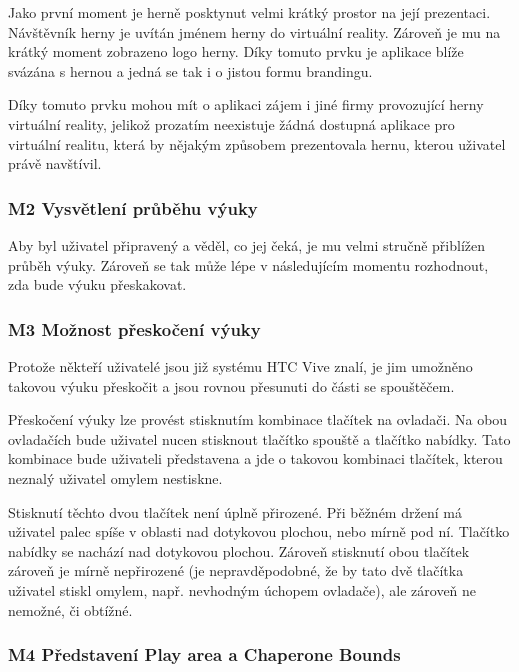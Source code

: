 Jako první moment je herně posktynut velmi krátký prostor na její
prezentaci. Návštěvník herny je uvítán jménem herny do virtuální
reality. Zároveň je mu na krátký moment zobrazeno logo herny. Díky
tomuto prvku je aplikace blíže svázána s hernou a jedná se tak i o
jistou formu brandingu.

Díky tomuto prvku mohou mít o aplikaci zájem i jiné firmy provozující
herny virtuální reality, jelikož prozatím neexistuje žádná dostupná
aplikace pro virtuální realitu, která by nějakým způsobem prezentovala
hernu, kterou uživatel právě navštívil.

\subsubsection{M2 Vysvětlení průběhu
výuky}\label{m2-vysvux11btlenuxed-prux16fbux11bhu-vuxfduky}

Aby byl uživatel připravený a věděl, co jej čeká, je mu velmi stručně
přiblížen průběh výuky. Zároveň se tak může lépe v následujícím momentu
rozhodnout, zda bude výuku přeskakovat.

\subsubsection{M3 Možnost přeskočení
výuky}\label{m3-moux17enost-pux159eskoux10denuxed-vuxfduky}

Protože někteří uživatelé jsou již systému HTC Vive znalí, je jim
umožněno takovou výuku přeskočit a jsou rovnou přesunuti do části se
spouštěčem.

Přeskočení výuky lze provést stisknutím kombinace tlačítek na ovladači.
Na obou ovladačích bude uživatel nucen stisknout tlačítko spouště a
tlačítko nabídky. Tato kombinace bude uživateli představena a jde o
takovou kombinaci tlačítek, kterou neznalý uživatel omylem nestiskne.

Stisknutí těchto dvou tlačítek není úplně přirozené. Při běžném držení
má uživatel palec spíše v oblasti nad dotykovou plochou, nebo mírně pod
ní. Tlačítko nabídky se nachází nad dotykovou plochou. Zároveň stisknutí
obou tlačítek zároveň je mírně nepřirozené (je nepravděpodobné, že by
tato dvě tlačítka uživatel stiskl omylem, např. nevhodným úchopem
ovladače), ale zároveň ne nemožné, či obtížné.

\subsubsection{M4 Představení Play area a Chaperone
Bounds}\label{m4-pux159edstavenuxed-play-area-a-chaperone-bounds}

